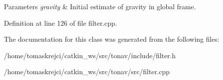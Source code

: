 \begin{DoxyParams}{Parameters}
{\em gravity} & Initial estimate of gravity in global frame. \\
\hline
\end{DoxyParams}


Definition at line 126 of file filter.\-cpp.



The documentation for this class was generated from the following files\-:\begin{DoxyCompactItemize}
\item 
/home/tomaskrejci/catkin\-\_\-ws/src/tonav/include/filter.\-h\item 
/home/tomaskrejci/catkin\-\_\-ws/src/tonav/src/filter.\-cpp\end{DoxyCompactItemize}
